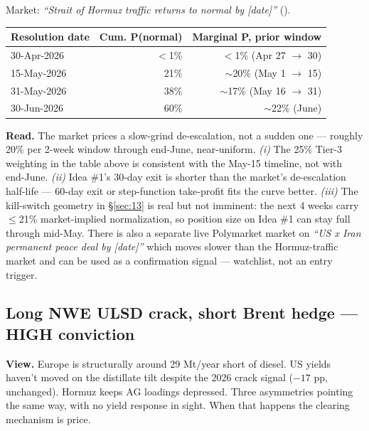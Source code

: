 \documentclass[10pt,a4paper]{article}
\begin{document}
\vspace{0.15cm}

\begin{callout}
\footnotesize
Market: \emph{``Strait of Hormuz traffic returns to normal by [date]''} ().
\smallskip

\begin{center}
\begin{tabular}{@{}lrr@{}}
\textbf{Resolution date} & \textbf{Cum. P(normal)} & \textbf{Marginal P, prior window} \\
\midrule
30-Apr-2026 & $<$1\%   & $<$1\% (Apr 27 $\rightarrow$ 30) \\
15-May-2026 & 21\%     & $\sim$20\% (May 1 $\rightarrow$ 15) \\
31-May-2026 & 38\%     & $\sim$17\% (May 16 $\rightarrow$ 31) \\
30-Jun-2026 & 60\%     & $\sim$22\% (June) \\
\end{tabular}
\end{center}

\smallskip
\textbf{Read.} The market prices a slow-grind de-escalation, not a sudden one --- roughly 20\% per 2-week window through end-June, near-uniform. \emph{(i)} The 25\% Tier-3 weighting in the table above is consistent with the May-15 timeline, not with end-June. \emph{(ii)} Idea \#1's 30-day exit is shorter than the market's de-escalation half-life --- 60-day exit or step-function take-profit fits the curve better. \emph{(iii)} The kill-switch geometry in \S\ref{sec:13} is real but not imminent: the next 4 weeks carry $\leq$21\% market-implied normalization, so position size on Idea \#1 can stay full through mid-May. There is also a separate live Polymarket market on \emph{``US x Iran permanent peace deal by [date]''} which moves slower than the Hormuz-traffic market and can be used as a confirmation signal --- watchlist, not an entry trigger.
\end{callout}

\vspace{0.2cm}

\subsection{Long \mbox{NWE} ULSD crack, short Brent hedge --- HIGH conviction}

\textbf{View.} Europe is structurally around 29 Mt/year short of diesel. US yields haven't moved on the distillate tilt despite the 2026 crack signal ($-17$ pp, unchanged). Hormuz keeps AG loadings depressed. Three asymmetries pointing the same way, with no yield response in sight. When that happens the clearing mechanism is price.
\end{document}
